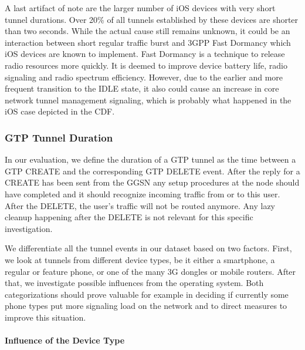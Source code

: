 A last artifact of note are the larger number of iOS devices with very short tunnel durations. Over 20\% of all tunnels established by these devices are shorter than two seconds. While the actual cause still remains unknown, it could be an interaction between short regular traffic burst and 3GPP Fast Dormancy \cite{gsma2011fdbestpract} which iOS devices are known to implement. Fast Dormancy is a technique to release radio resources more quickly. It is deemed to improve device battery life, radio signaling and radio spectrum efficiency. However, due to the earlier and more frequent transition to the IDLE state, it also could cause an increase in core network tunnel management signaling, which is probably what happened in the iOS case depicted in the CDF.


\subsubsection{GTP Tunnel Duration}

In our evaluation, we define the duration of a GTP tunnel as the time between a GTP CREATE and the corresponding GTP DELETE event. After the reply for a CREATE has been sent from the \gls{GGSN} any setup procedures at the node should have completed and it should recognize incoming traffic from or to this user. After the DELETE, the user's traffic will not be routed anymore. Any lazy cleanup happening after the DELETE is not relevant for this specific investigation.

We differentiate all the tunnel events in our dataset based on two factors. First, we look at tunnels from different device types, be it either a smartphone, a regular or feature phone, or one of the many 3G dongles or mobile routers. After that, we investigate possible influences from the operating system. Both categorizations should prove valuable for example in deciding if currently some phone types put more signaling load on the network and to direct measures to improve this situation.



\paragraph{Influence of the Device Type}

